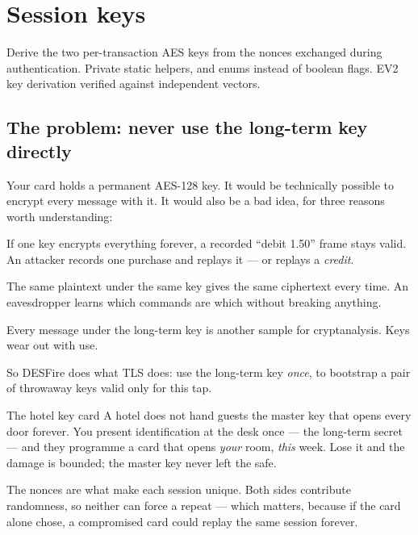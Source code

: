 \chapter{Session keys}
\label{ch:sesskeys}

\chapterbrief
  {Derive the two per-transaction AES keys from the nonces exchanged during authentication.}
  {Private static helpers, and enums instead of boolean flags.}
  {EV2 key derivation verified against independent vectors.}

\section{The problem: never use the long-term key directly}

Your card holds a permanent AES-128 key. It would be technically possible to
encrypt every message with it. It would also be a bad idea, for three reasons
worth understanding:

\begin{description}[leftmargin=0pt, style=nextline]
  \item[Replay.] If one key encrypts everything forever, a recorded ``debit
        1.50'' frame stays valid. An attacker records one purchase and replays it
        --- or replays a \emph{credit}.
  \item[Traffic analysis.] The same plaintext under the same key gives the same
        ciphertext every time. An eavesdropper learns which commands are which
        without breaking anything.
  \item[Exposure.] Every message under the long-term key is another sample for
        cryptanalysis. Keys wear out with use.
\end{description}

So DESFire does what TLS does: use the long-term key \emph{once}, to bootstrap a
pair of throwaway keys valid only for this tap.

\begin{analogy}{The hotel key card}
A hotel does not hand guests the master key that opens every door forever. You
present identification at the desk once --- the long-term secret --- and they
programme a card that opens \emph{your} room, \emph{this} week. Lose it and the
damage is bounded; the master key never left the safe.

The nonces are what make each session unique. Both sides contribute randomness,
so neither can force a repeat --- which matters, because if the card alone chose,
a compromised card could replay the same session forever.
\end{analogy}

